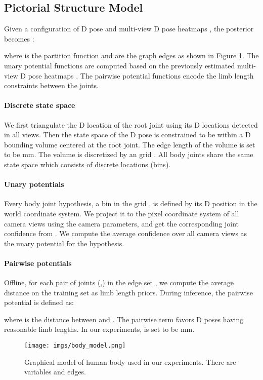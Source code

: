 \documentclass[10pt,twocolumn,letterpaper]{article}
\begin{document}
\subsection{Pictorial Structure Model}
Given a configuration of D pose  and multi-view D pose heatmaps , the posterior becomes \cite{belagiannis20143D}:

where  is the partition function and  are the graph edges as shown in Figure \ref{fig:body_model}. The unary potential functions  are computed based on the previously estimated multi-view D pose heatmaps . The pairwise potential functions  encode the limb length constraints between the joints.


\paragraph{Discrete state space} We first triangulate the D location of the root joint using its D locations detected in all views. Then the state space of the D pose is constrained to be within a D bounding volume centered at the root joint. The edge length  of the volume is set to be mm. The volume is discretized by an  grid . All body joints share the same state space  which consists of  discrete locations (bins).

\paragraph{Unary potentials} Every body joint hypothesis, \ie a bin in the grid , is defined by its D position in the world coordinate system. We project it to the pixel coordinate system of all camera views using the camera parameters, and get the corresponding joint confidence from . We compute the average confidence over all camera views as the unary potential for the hypothesis.

\paragraph{Pairwise potentials}
Offline, for each pair of joints (,) in the edge set , we compute the average distance  on the training set as limb length priors. During inference, the pairwise potential is defined as:

where  is the distance between  and .
The pairwise term favors D poses having reasonable limb lengths. In our experiments,  is set to be mm.

\begin{figure}
	\centering
	\texttt{[image: imgs/body\_model.png]}
	\caption{Graphical model of human body used in our experiments. There are  variables and  edges. }
	\label{fig:body_model}
\end{figure}
\end{document}
